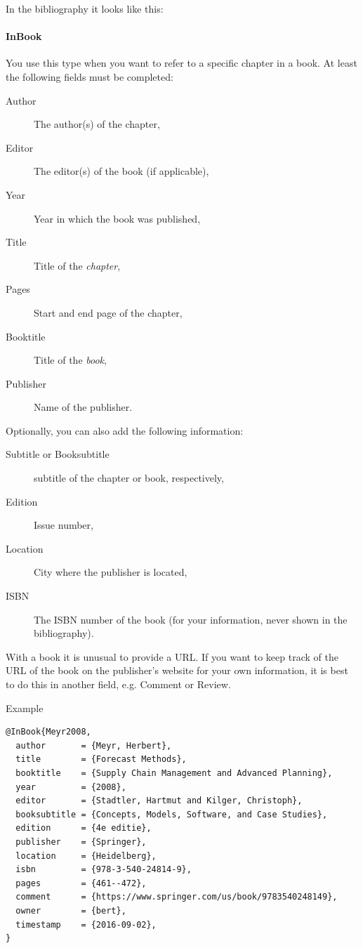 In the bibliography it looks like this: 

\paragraph{InBook}

You use this type when you want to refer to a specific chapter in a book. At least the following fields must be completed:

\begin{description}
  \item[Author] The author(s) of the chapter,
  \item[Editor] The editor(s) of the book (if applicable),
  \item[Year] Year in which the book was published,
  \item[Title] Title of the \emph{chapter},
  \item[Pages] Start and end page of the chapter,
  \item[Booktitle] Title of the \emph{book},
  \item[Publisher] Name of the publisher.
\end{description}

Optionally, you can also add the following information:

\begin{description}
  \item[Subtitle or Booksubtitle] subtitle of the chapter or book, respectively,
  \item[Edition] Issue number,
  \item[Location] City where the publisher is located,
  \item[ISBN] The ISBN number of the book (for your information, never shown in the bibliography).
\end{description}

With a book it is unusual to provide a URL. If you want to keep track of the URL of the book on the publisher's website for your own information, it is best to do this in another field, e.g. Comment or Review.

Example
\begin{verbatim}
@InBook{Meyr2008,
  author       = {Meyr, Herbert},
  title        = {Forecast Methods},
  booktitle    = {Supply Chain Management and Advanced Planning},
  year         = {2008},
  editor       = {Stadtler, Hartmut and Kilger, Christoph},
  booksubtitle = {Concepts, Models, Software, and Case Studies},
  edition      = {4e editie},
  publisher    = {Springer},
  location     = {Heidelberg},
  isbn         = {978-3-540-24814-9},
  pages        = {461--472},
  comment      = {https://www.springer.com/us/book/9783540248149},
  owner        = {bert},
  timestamp    = {2016-09-02},
}
\end{verbatim}


